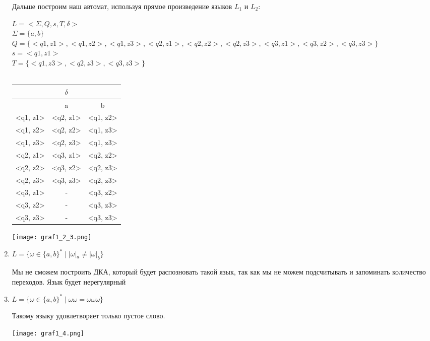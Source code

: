 \documentclass[12pt]{article}
\begin{document}
\begin{enumerate}
    Дальше построим наш автомат, используя прямое произведение языков $L_1$ и $L_2$:
    \begin{flushleft}
    $L = <\Sigma, Q, s, T, \delta>$\\
    $\Sigma = \{a, b\}$\\
    $Q = \{<q1, z1>, <q1, z2>, <q1, z3>, <q2, z1>, <q2, z2>, <q2, z3>, <q3, z1>, <q3, z2>, <q3, z3>\}$\\
    $s = <q1, z1>$\\
    $T = \{<q1, z3>, <q2, z3>, <q3, z3>\}$\\
    \\
    \begin{tabular}{ |c|c|c| }
        \hline
        \multicolumn{3}{|c|}{$\delta$} \\
        \hline
         & a & b \\
        \hline
        <q1, z1> & <q2, z1> & <q1, z2> \\
        \hline
        <q1, z2> & <q2, z2> & <q1, z3> \\
        \hline
        <q1, z3> & <q2, z3> & <q1, z3> \\
        \hline
        <q2, z1> & <q3, z1> & <q2, z2> \\
        \hline
        <q2, z2> & <q3, z2> & <q2, z3> \\
        \hline
        <q2, z3> & <q3, z3> & <q2, z3> \\
        \hline
        <q3, z1> &    -   & <q3, z2> \\
        \hline
        <q3, z2> &    -    & <q3, z3> \\
        \hline
        <q3, z3> &    -   & <q3, z3> \\
        \hline
    \end{tabular}
    
    \texttt{[image: graf1\_2\_3.png]}
    \end{flushleft}
    \item $L = \{\omega \in \{a, b\}^* \; | \; |\omega|_a \neq |\omega|_b \}$
    
    Мы не сможем построить ДКА, который будет распозновать такой язык, так как мы не можем подсчитывать и запоминать количество переходов. Язык будет нерегулярный
 

    \item $L = \{\omega \in \{a, b\}^* \; | \; \omega\omega = \omega\omega\omega\}$
    
    Такому языку удовлетворяет только пустое слово.
    \begin{center}
        \texttt{[image: graf1\_4.png]}
    \end{center}
\end{enumerate}
\end{document}
